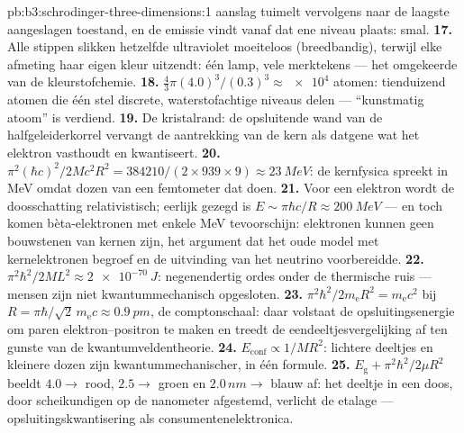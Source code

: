 \begin{solution}{pb:b3:schrodinger-three-dimensions:1}
aanslag tuimelt vervolgens naar de laagste aangeslagen toestand, en de
emissie vindt vanaf dat ene niveau plaats: smal.
\textbf{17.} Alle stippen slikken hetzelfde ultraviolet moeiteloos
(breedbandig), terwijl elke afmeting haar eigen kleur uitzendt: één lamp,
vele merktekens --- het omgekeerde van de kleurstofchemie.
\textbf{18.} $\tfrac43\pi(4.0)^3/(0.3)^3 \approx \num{e4}$ atomen:
tienduizend atomen die één stel discrete, waterstofachtige niveaus delen
--- ``kunstmatig atoom'' is verdiend.
\textbf{19.} De kristalrand: de opsluitende wand van de halfgeleiderkorrel
vervangt de aantrekking van de kern als datgene wat het elektron
vasthoudt en kwantiseert.
\textbf{20.} $\pi^2(\hbar c)^2/2Mc^2R^2 = 384210/(2 \times 939
\times 9) \approx \qty{23}{MeV}$: de kernfysica spreekt in MeV omdat
dozen van een femtometer dat doen.
\textbf{21.} Voor een elektron wordt de doosschatting relativistisch;
eerlijk gezegd is $E \sim \pi\hbar c/R \approx \qty{200}{MeV}$ --- en
toch komen bèta-elektronen met enkele MeV tevoorschijn: elektronen kunnen
geen bouwstenen van kernen zijn, het argument dat het oude model met
kernelektronen begroef en de uitvinding van het neutrino voorbereidde.
\textbf{22.} $\pi^2\hbar^2/2ML^2 \approx \qty{2e-70}{J}$:
negenendertig ordes onder de thermische ruis --- mensen zijn niet
kwantummechanisch opgesloten.
\textbf{23.} $\pi^2\hbar^2/2m_{\text{e}}R^2 = m_{\text{e}}c^2$ bij
$R = \pi\hbar/\sqrt2\,m_{\text{e}}c \approx \qty{0.9}{pm}$, de
comptonschaal: daar volstaat de opsluitingsenergie om paren
elektron--positron te maken en treedt de eendeeltjesvergelijking af ten
gunste van de kwantumveldentheorie.
\textbf{24.} $E_{\text{conf}} \propto 1/MR^2$: lichtere deeltjes en
kleinere dozen zijn kwantummechanischer, in één formule.
\textbf{25.} $E_{\text{g}} + \pi^2\hbar^2/2\mu R^2$ beeldt $4.0 \to$
rood, $2.5 \to$ groen en $2.0\,\unit{nm} \to$ blauw af: het deeltje in
een doos, door scheikundigen op de nanometer afgestemd, verlicht de
etalage --- opsluitingskwantisering als consumentenelektronica.
\end{solution}
